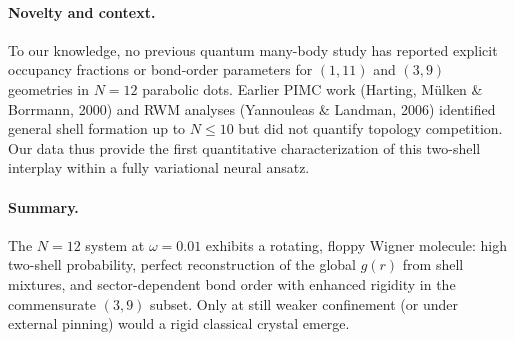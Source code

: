 \paragraph{Novelty and context.}
To our knowledge, no previous quantum many-body study has reported explicit occupancy fractions or bond-order parameters for $(1,11)$ and $(3,9)$ geometries in $N=12$ parabolic dots.  
Earlier PIMC work (Harting, Mülken \& Borrmann, 2000) and RWM analyses (Yannouleas \& Landman, 2006) identified general shell formation up to $N\le10$ but did not quantify topology competition.  
Our data thus provide the first quantitative characterization of this two-shell interplay within a fully variational neural ansatz.

\paragraph{Summary.}
The $N=12$ system at $\omega=0.01$ exhibits a rotating, floppy Wigner molecule:  
high two-shell probability, perfect reconstruction of the global $g(r)$ from shell mixtures, and sector-dependent bond order with enhanced rigidity in the commensurate $(3,9)$ subset.  
Only at still weaker confinement (or under external pinning) would a rigid classical crystal emerge.

